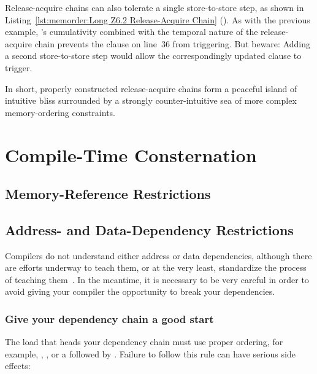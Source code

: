 Release-acquire chains can also tolerate a single store-to-store step,
as shown in
Listing~\ref{lst:memorder:Long Z6.2 Release-Acquire Chain}
().
As with the previous example, 's cumulativity
combined with the temporal nature of the release-acquire chain
prevents the  clause on line~36 from triggering.
But beware: Adding a second store-to-store step would allow the correspondingly
updated  clause to trigger.


In short, properly constructed release-acquire chains form a peaceful
island of intuitive bliss surrounded by a strongly counter-intuitive
sea of more complex memory-ordering constraints.


\section{Compile-Time Consternation}
\label{sec:memorder:Compile-Time Consternation}

\subsection{Memory-Reference Restrictions}
\label{sec:memorder:Memory-Reference Restrictions}


\subsection{Address- and Data-Dependency Restrictions}
\label{sec:memorder:Address- and Data-Dependency Restrictions}

Compilers do not understand either address or data dependencies,
although there are efforts underway to teach them, or at the very
least, standardize the process of teaching
them~\cite{PaulEMcKennneyConsumeP0190R0,PaulEMcKenney2017markconsumeP0462R1}.
In the meantime, it is necessary to be very careful in order to avoid
giving your compiler the opportunity to break your dependencies.

\subsubsection{Give your dependency chain a good start}
The load that heads your dependency chain must use proper
ordering, for example, ,
, or
a  followed by .
Failure to follow this rule can have serious side effects:

